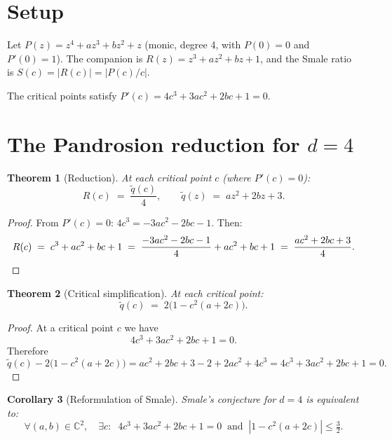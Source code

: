 \documentclass[11pt,a4paper]{article}
\newtheorem{theorem}{Theorem}[section]
\newtheorem{corollary}[theorem]{Corollary}
\begin{document}
\section{Setup}

Let $P(z) = z^4 + az^3 + bz^2 + z$ (monic, degree 4, with $P(0) = 0$ and $P'(0) = 1$). The companion is $R(z) = z^3 + az^2 + bz + 1$, and the Smale ratio is $S(c) = |R(c)| = |P(c)/c|$.

The critical points satisfy $P'(c) = 4c^3 + 3ac^2 + 2bc + 1 = 0$.

\section{The Pandrosion reduction for $d = 4$}

\begin{theorem}[Reduction]\label{thm:reduction}
At each critical point $c$ (where $P'(c) = 0$):
\begin{equation}
\boxed{R(c) \;=\; \frac{\tilde{q}(c)}{4}, \qquad \tilde{q}(z) \;=\; az^2 + 2bz + 3.}
\end{equation}
\end{theorem}

\begin{proof}
From $P'(c) = 0$: $4c^3 = -3ac^2 - 2bc - 1$. Then:
\begin{equation*}
R(c) \;=\; c^3 + ac^2 + bc + 1 \;=\; \frac{-3ac^2 - 2bc - 1}{4} + ac^2 + bc + 1 \;=\; \frac{ac^2 + 2bc + 3}{4}. \qedhere
\end{equation*}
\end{proof}

\begin{theorem}[Critical simplification]
At each critical point:
\begin{equation}
\tilde{q}(c) \;=\; 2\bigl(1 - c^2(a + 2c)\bigr).
\end{equation}
\end{theorem}

\begin{proof}
At a critical point $c$ we have
\[
4c^3+3ac^2+2bc+1=0.
\]
Therefore
\[
\tilde q(c)-2\bigl(1-c^2(a+2c)\bigr)
=ac^2+2bc+3-2+2ac^2+4c^3
=4c^3+3ac^2+2bc+1=0.
\]
\end{proof}

\begin{corollary}[Reformulation of Smale]
Smale's conjecture for $d = 4$ is equivalent to:
\begin{equation}
\forall (a, b) \in \mathbb{C}^2, \quad \exists c: \;\; 4c^3 + 3ac^2 + 2bc + 1 = 0 \;\; \text{and} \;\; |1 - c^2(a + 2c)| \le \tfrac{3}{2}.
\end{equation}
\end{corollary}
\end{document}
